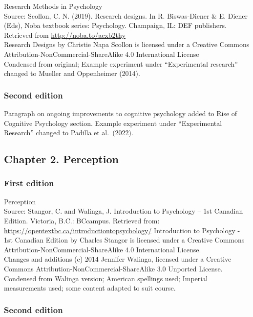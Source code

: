 \documentclass[
]{krantz}
\begin{document}
Research Methods in Psychology\\
Source: Scollon, C. N. (2019). Research designs. In R. Biswas-Diener \& E. Diener (Eds), Noba textbook series: Psychology. Champaign, IL: DEF publishers. Retrieved from \url{http://noba.to/acxb2thy}\\
Research Designs by Christie Napa Scollon is licensed under a Creative Commons Attribution-NonCommercial-ShareAlike 4.0 International License\\
Condensed from original; Example experiment under ``Experimental research'' changed to Mueller and Oppenheimer (2014).

\subsubsection*{Second edition}\label{second-edition-1}


Paragraph on ongoing improvements to cognitive psychology added to Rise of Cognitive Psychology section. Example experiment under ``Experimental Research'' changed to Padilla et al.~(2022).

\subsection*{Chapter 2. Perception}\label{chapter-2.-perception}


\subsubsection*{First edition}\label{first-edition-2}


Perception\\
Source: Stangor, C. and Walinga, J. Introduction to Psychology -- 1st Canadian Edition. Victoria, B.C.: BCcampus. Retrieved from: \url{https://opentextbc.ca/introductiontopsychology/}
Introduction to Psychology - 1st Canadian Edition by Charles Stangor is licensed under a Creative Commons Attribution-NonCommercial-ShareAlike 4.0 International License.\\
Changes and additions (c) 2014 Jennifer Walinga, licensed under a Creative Commons Attribution-NonCommercial-ShareAlike 3.0 Unported License.\\
Condensed from Walinga version; American spellings used; Imperial measurements used; some content adapted to suit course.

\subsubsection*{Second edition}\label{second-edition-2}
\end{document}
